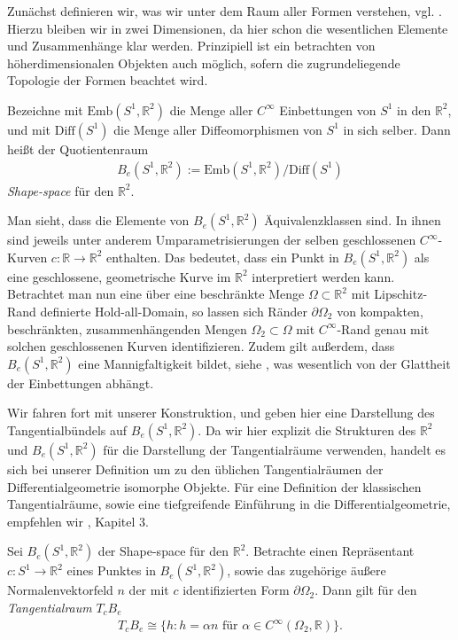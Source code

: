 Zunächst definieren wir, was wir unter dem Raum aller Formen verstehen, vgl. \cite{bfgs1}. Hierzu bleiben wir in zwei Dimensionen, da hier schon die wesentlichen Elemente und Zusammenhänge klar werden. Prinzipiell ist ein betrachten von höherdimensionalen Objekten auch möglich, sofern die zugrundeliegende Topologie der Formen beachtet wird.

\begin{defi}
Bezeichne mit $\text{Emb}(S^1, \mathbb{R}^2)$ die Menge aller $C^\infty$ Einbettungen von $S^1$ in den $\mathbb{R}^2$, und mit $\text{Diff}(S^1)$ die Menge aller Diffeomorphismen von $S^1$ in sich selber. Dann heißt der Quotientenraum
\begin{align*}
	B_e(S^1,\mathbb{R}^2) := \text{Emb}(S^1, \mathbb{R}^2) / \text{Diff}(S^1)
\end{align*}
\textit{Shape-space} für den $\mathbb{R}^2$.
\end{defi}

Man sieht, dass die Elemente von $B_e(S^1,\mathbb{R}^2)$ Äquivalenzklassen sind. In ihnen sind jeweils unter anderem Umparametrisierungen der selben geschlossenen $C^\infty$-Kurven $c: \mathbb{R} \rightarrow \mathbb{R}^2$ enthalten. Das bedeutet, dass ein Punkt in $B_e(S^1,\mathbb{R}^2)$ als eine geschlossene, geometrische Kurve im $\mathbb{R}^2$ interpretiert werden kann. Betrachtet man nun eine über eine beschränkte Menge $\Omega\subset\mathbb{R}^2$ mit Lipschitz-Rand definierte Hold-all-Domain, so lassen sich Ränder $\partial\Omega_2$ von kompakten, beschränkten, zusammenhängenden Mengen $\Omega_2\subset \Omega$ mit $C^\infty$-Rand genau mit solchen geschlossenen Kurven identifizieren. Zudem gilt außerdem, dass $B_e(S^1,\mathbb{R}^2)$ eine Mannigfaltigkeit bildet, siehe \cite{bfgs1}, was wesentlich von der Glattheit der Einbettungen abhängt.

Wir fahren fort mit unserer Konstruktion, und geben hier eine Darstellung des Tangentialbündels auf $B_e(S^1,\mathbb{R}^2)$. Da wir hier explizit die Strukturen des $\mathbb{R}^2$ und $B_e(S^1,\mathbb{R}^2)$ für die Darstellung der Tangentialräume verwenden, handelt es sich bei unserer Definition um zu den üblichen Tangentialräumen der Differentialgeometrie isomorphe Objekte. Für eine Definition der klassischen Tangentialräume, sowie eine tiefgreifende Einführung in die Differentialgeometrie, empfehlen wir \cite{LeeDGEO}, Kapitel 3.

\begin{defi}[Tangentialbündel]\label{Tangentialvektor}
Sei $B_e(S^1, \mathbb{R}^2)$ der Shape-space für den $\mathbb{R}^2$. Betrachte einen Repräsentant $c: S^1 \rightarrow \mathbb{R}^2$ eines Punktes in $B_e(S^1, \mathbb{R}^2)$, sowie das zugehörige äußere Normalenvektorfeld $n$ der mit $c$ identifizierten Form $\partial\Omega_2$. Dann gilt für den \textit{Tangentialraum} $T_cB_e$
\begin{align*}
	T_cB_e \cong \{h : h = \alpha n \text{ für } \alpha \in C^\infty(\Omega_2,\mathbb{R})\}.
\end{align*}

\end{defi}

